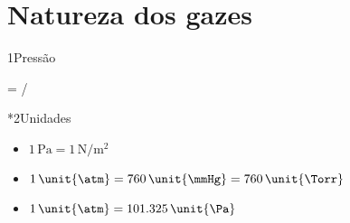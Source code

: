 \section*{Natureza dos gazes}

\begin{sectionBox}1{Pressão}

    \begin{BM}
         = /
    \end{BM}

    \begin{sectionBox}*2{Unidades}
        \begin{itemize}
            \item \( 1\,\unit{\Pa}  =   1    \,\unit{\N\per\metre^2} \)
            \item \( 1\,\unit{\atm} = 760    \,\unit{\mmHg} = 760\,\unit{\Torr} \)
            \item \( 1\,\unit{\atm} = 101.325\,\unit{\Pa} \)
        \end{itemize}
    \end{sectionBox}

\end{sectionBox}

